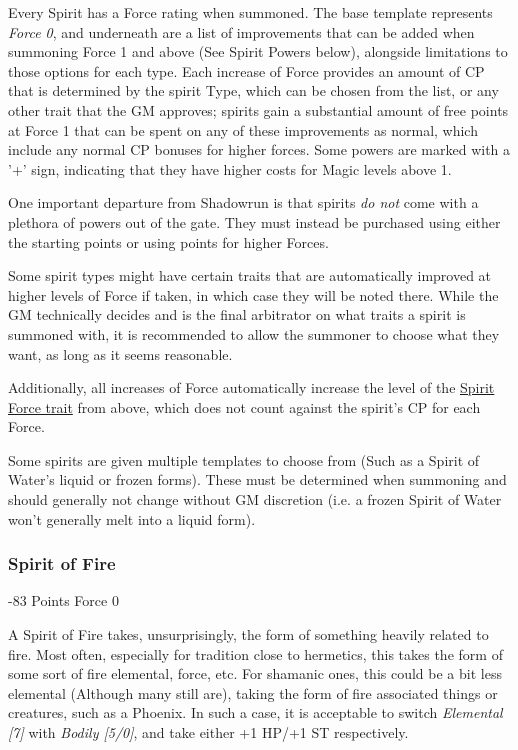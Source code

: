 \begin{multicols*}{3}
	Every Spirit has a Force rating when summoned. The base template represents \textit{Force 0}, and underneath are a list of improvements that can be added when summoning Force 1 and above (See Spirit Powers below), alongside limitations to those options for each type. Each increase of Force provides an amount of CP that is determined by the spirit Type, which can be chosen from the list, or any other trait that the GM approves; spirits gain a substantial amount of free points at Force 1 that can be spent on any of these improvements as normal, which include any normal CP bonuses for higher forces. Some powers are marked with a '+' sign, indicating that they have higher costs for Magic levels above 1.
	
	One important departure from Shadowrun is that spirits \textit{do not} come with a plethora of powers out of the gate. They must instead be purchased using either the starting points or using points for higher Forces.
	
	Some spirit types might have certain traits that are automatically improved at higher levels of Force if taken, in which case they will be noted there. While the GM technically decides and is the final arbitrator on what traits a spirit is summoned with, it is recommended to allow the summoner to choose what they want, as long as it seems reasonable.
	
	Additionally, all increases of Force automatically increase the level of the \hyperref[spirit_force]{Spirit Force trait} from above, which does not count against the spirit's CP for each Force.
	
	Some spirits are given multiple templates to choose from (Such as a Spirit of Water's liquid or frozen forms). These must be determined when summoning and should generally not change without GM discretion (i.e. a frozen Spirit of Water won't generally melt into a liquid form).
	
		
	\subsubsection{Spirit of Fire}
	\begin{flushright}
		-83 Points Force 0
	\end{flushright}
	
	A Spirit of Fire takes, unsurprisingly, the form of something heavily related to fire. Most often, especially for tradition close to hermetics, this takes the form of some sort of fire elemental, force, etc. For shamanic ones, this could be a bit less elemental (Although many still are), taking the form of fire associated things or creatures, such as a Phoenix. In such a case, it is acceptable to switch \textit{Elemental [7]} with \textit{Bodily [5/0]}, and take either +1 HP/+1 ST respectively.
	

\end{multicols*}
